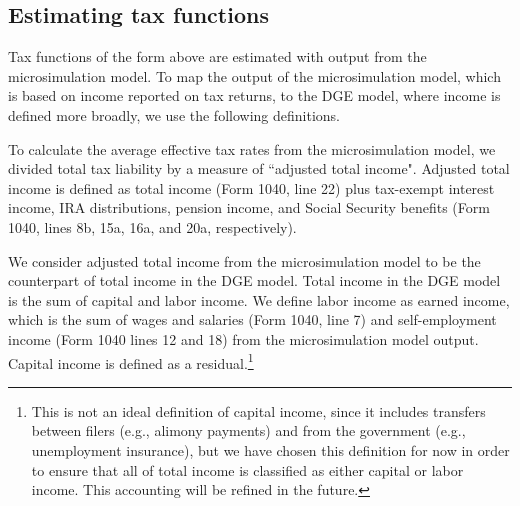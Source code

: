 \documentclass[letterpaper,12pt]{article}
\theoremstyle{definition}
\begin{document}
\begin{spacing}{1.5}
%


 \subsection{Estimating tax functions}\label{SecEstTaxFunc}
 
 Tax functions of the form above are estimated with output from the microsimulation model.  To map the output of the microsimulation model, which is based on income reported on tax returns, to the DGE model, where income is defined more broadly, we use the following definitions.
 
 To calculate the average effective tax rates from the microsimulation model, we divided total tax liability by a measure of ``adjusted total income".  Adjusted total income is defined as total income (Form 1040, line 22) plus tax-exempt interest income, IRA distributions, pension income, and Social Security benefits (Form 1040, lines 8b, 15a, 16a, and 20a, respectively).  
 
 We consider adjusted total income from the microsimulation model to be the counterpart of total income in the DGE model.  Total income in the DGE model is the sum of capital and labor income.  We define labor income as earned income, which is the sum of wages and salaries (Form 1040, line 7) and self-employment income (Form 1040 lines 12 and 18) from the microsimulation model output.  Capital income is defined as a residual.\footnote{This is not an ideal definition of capital income, since it includes transfers between filers (e.g., alimony payments) and from the government (e.g., unemployment insurance), but we have chosen this definition for now in order to ensure that all of total income is classified as either capital or labor income. This accounting will be refined in the future.}
 

\end{spacing}
\end{document}
